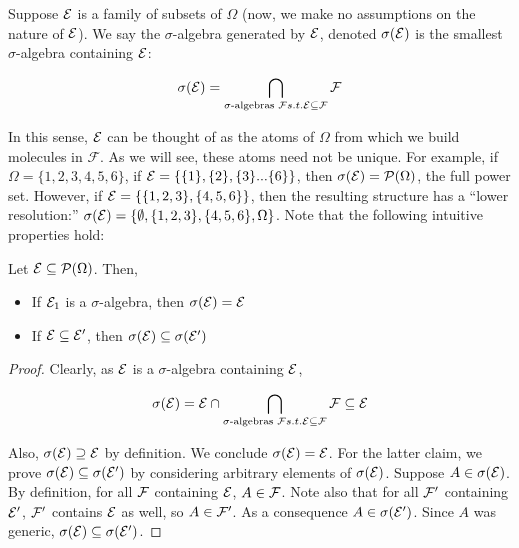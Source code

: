 Suppose $\mathcal E$ is a family of subsets of $\Omega$ (now, we make no assumptions on the 
nature of $\mathcal E$). We say the $\sigma$-algebra generated by $\mathcal E$, denoted $\sigma(\mathcal E)$ is 
the smallest $\sigma$-algebra containing $\mathcal E$: 

\[ \sigma(\mathcal E) = \bigcap_{\text{$\sigma$-algebras } \mathcal F s.t. \mathcal E \subseteq \mathcal F}\mathcal F \]

In this sense, $\mathcal E$ can be thought of as the atoms of $\Omega$ from which we build 
molecules in $\mathcal F$. As we will see, these atoms need not be unique. For example, if 
$\Omega = \{1,2,3,4,5,6\}$, if $\mathcal E = \{\{1\},\{2\},\{3\}...\{6\}\}$, then $\sigma(\mathcal E) = \mathcal P(\Omega)$, the 
full power set. However, if $\mathcal E = \{\{1,2,3\}, \{4,5,6\}\}$, then the resulting structure has a ``lower resolution:''
 $\sigma(\mathcal E) = \{\emptyset, \{1,2,3\},\{4,5,6\}, \Omega\}$. Note that the following 
 intuitive properties hold: 

 \begin{lemma}
    Let $\mathcal E \subseteq \mathcal P(\Omega)$. Then, 
    \begin{itemize}
        \item If $\mathcal E_1$ is a $\sigma$-algebra, then $\sigma(\mathcal E) = \mathcal E$ 
        \item If $\mathcal E \subseteq \mathcal E'$, then $\sigma(\mathcal E) \subseteq \sigma(\mathcal E')$
    \end{itemize}
\end{lemma}

\begin{proof}
    Clearly, as $\mathcal E$ is a $\sigma$-algebra containing $\mathcal E$, 

    \[ \sigma(\mathcal E) = \mathcal E \cap \bigcap_{\text{$\sigma$-algebras } \mathcal F s.t. \mathcal E \subseteq \mathcal F}\mathcal F \subseteq \mathcal E \]

    Also, $\sigma(\mathcal E) \supseteq \mathcal E$ by definition. We conclude $\sigma(\mathcal E) = \mathcal E$. For the latter claim, 
    we prove $\sigma(\mathcal E) \subseteq \sigma(\mathcal E')$ by considering arbitrary elements of 
    $\sigma(\mathcal E)$. Suppose $A \in \sigma(\mathcal E)$. By definition, for all $\mathcal F$ containing $\mathcal E$, $A \in \mathcal F$. 
    Note also that for all $\mathcal F'$ containing $\mathcal E'$, $\mathcal F'$ contains $\mathcal E$ as well, so $A \in \mathcal F'$. 
    As a consequence $A \in \sigma(\mathcal E')$. Since $A$ was generic, $\sigma(\mathcal E) \subseteq \sigma(\mathcal E')$.
\end{proof}

